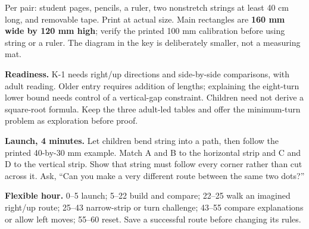 Per pair: student pages, pencils, a ruler, two nonstretch strings at least 40 cm long, and removable tape. Print at actual size. Main rectangles are \textbf{160 mm wide by 120 mm high}; verify the printed 100 mm calibration before using string or a ruler. The diagram in the key is deliberately smaller, not a measuring mat.

\textbf{Readiness.} K-1 needs right/up directions and side-by-side comparisons, with adult reading. Older entry requires addition of lengths; explaining the eight-turn lower bound needs control of a vertical-gap constraint. Children need not derive a square-root formula. Keep the three adult-led tables and offer the minimum-turn problem as exploration before proof.

\textbf{Launch, 4 minutes.} Let children bend string into a path, then follow the printed 40-by-30 mm example. Match A and B to the horizontal strip and C and D to the vertical strip. Show that string must follow every corner rather than cut across it. Ask, ``Can you make a very different route between the same two dots?''

\textbf{Flexible hour.} 0--5 launch; 5--22 build and compare; 22--25 walk an imagined right/up route; 25--43 narrow-strip or turn challenge; 43--55 compare explanations or allow left moves; 55--60 reset. Save a successful route before changing its rules.
